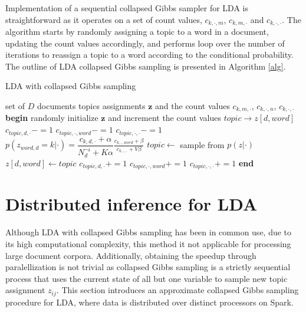 \documentclass[journal]{IEEEtran}
\begin{document}
Implementation of a sequential collapsed Gibbs sampler for LDA is straightforward as it operates on a set of count values, $c_{k,\cdot,m}$, $c_{k,m,\cdot}$ and $c_{k,\cdot,\cdot}$. The algorithm starts by randomly assigning a topic to a word in a  document, updating the count values accordingly, and performs loop over the number of iterations to reassign a topic to a word according to the conditional probability. The outline of LDA collapsed Gibbs sampling is presented in Algorithm \ref{alg}.
 \begin{algorithm}
\caption{LDA with collapsed Gibbs sampling}
\label{alg}
\begin{algorithmic}
\scriptsize
\Require set of $D$ documents
\Ensure topics assignments $\textbf{z}$ and the count values $c_{k,m,\cdot}$, $c_{k,\cdot,n}$, $c_{k,\cdot,\cdot}$
\State \textbf{begin}
\State randomly initialize $\textbf{z}$ and increment the count values
            \State $ topic \rightarrow z[d, word]$
            \State $c_{topic,d,\cdot} -= 1$
            \State $c_{topic,\cdot,word}-=1$
            \State $c_{topic,\cdot,\cdot}-=1$
            	\State $p(z_{word,d}=k|\cdot) = \dfrac{c_{k,d,\cdot} + \alpha}{N_{d}^{\lnot i}+K\alpha} \frac{c_{k,\cdot,word} + \beta}{c_{k,\cdot,\cdot} + V\beta}$
            \EndFor
            \State $topic \leftarrow$ sample from $p(z|\cdot)$
            \State $z[d, word] \leftarrow topic $
            \State $c_{topic,d,\cdot} += 1$
            \State $c_{topic,\cdot,word} +=1$
            \State $c_{topic,\cdot,\cdot}+=1$
		 \EndFor            
      \EndFor 
   \EndFor
\State \textbf{end}
        \end{algorithmic}
    \end{algorithm}

\section{Distributed inference for LDA}
\label{sec:slda}
Although LDA with collapsed Gibbs sampling has been in common use, due to its high computational complexity, this method it not applicable for processing large document corpora. Additionally, obtaining the speedup through paralellization is not trivial as collapsed Gibbs sampling is a strictly sequential process that uses the current state of all but one variable to sample new topic assignment $z_{ij}$. This section introduces an approximate collapsed Gibbs sampling procedure for LDA, where data is distributed over distinct processors on Spark.
\end{document}
